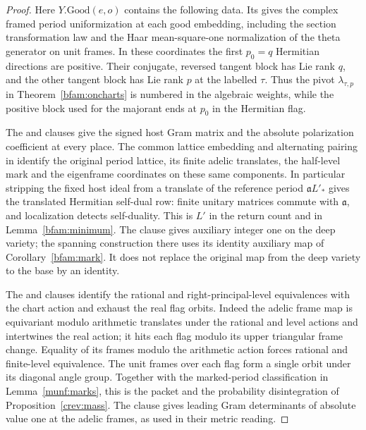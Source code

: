 \begin{proof}
Here \(Y.\mathrm{Good}(e,o)\) contains the following data. Its
 gives the complex framed period uniformization at each
good embedding, including the section transformation law and the
Haar mean-square-one normalization of the theta generator on unit
frames. In these coordinates the first \(p_0=q\) Hermitian
directions are positive. Their conjugate, reversed tangent block
has Lie rank \(q\), and the other tangent block has Lie rank \(p\)
at the labelled \(\tau\). Thus the pivot \(\lambda_{\tau,p}\)
in Theorem~\ref{bfam:oncharts} is numbered in the algebraic
weights, while the positive block used for the majorant ends at
\(p_0\) in the Hermitian flag.

The  and  clauses give the signed host
Gram matrix and the absolute polarization coefficient at every
place. The common lattice embedding and alternating pairing in
 identify the original period lattice, its finite
adelic translates, the half-level mark and the eigenframe
coordinates on these same components. In particular stripping the
fixed host ideal from a translate of the reference period
\(\mathfrak a L'_*\) gives the translated Hermitian self-dual row:
finite unitary matrices commute with \(\mathfrak a\), and
localization detects self-duality. This is \(L'\) in the return
count and in Lemma~\ref{bfam:minimum}. The  clause gives
auxiliary integer one on the deep variety; the spanning construction
there uses its identity auxiliary map of Corollary~\ref{bfam:mark}.
It does not replace the original map from the deep variety to the
base by an identity.

The  and  clauses identify the rational
and right-principal-level equivalences with the chart action and
exhaust the real flag orbits. Indeed the adelic frame map is
equivariant modulo arithmetic translates under the rational and
level actions and intertwines the real action; it hits each flag
modulo its upper triangular frame change. Equality of its frames
modulo the arithmetic action forces rational and finite-level
equivalence. The unit frames over each flag form a single orbit
under its diagonal angle group. Together with the marked-period
classification in Lemma~\ref{munf:marks}, this is the packet and
the probability disintegration of Proposition~\ref{crev:mass}.
The  clause gives leading Gram determinants of absolute
value one at the adelic frames, as used in their metric reading.


\end{proof}
